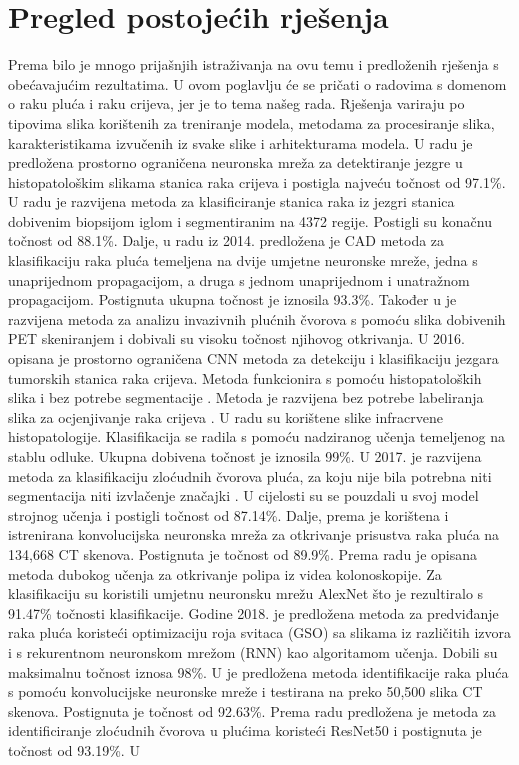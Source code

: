 \documentclass[conference, utf8]{IEEEtran}
\begin{document}
	\section{Pregled postojećih rješenja}
	Prema \cite{mehmood2022malignancy} bilo je mnogo prijašnjih istraživanja na ovu temu i predloženih rješenja s obećavajućim rezultatima. U ovom poglavlju će se pričati o radovima s domenom o raku pluća i raku crijeva, jer je to tema našeg rada. Rješenja variraju po tipovima slika korištenih za treniranje modela, metodama za procesiranje slika, karakteristikama izvučenih iz svake slike i arhitekturama modela. U radu \cite{Sirinukunwattana} je predložena prostorno ograničena neuronska mreža za detektiranje jezgre u histopatološkim slikama stanica raka crijeva i postigla najveću točnost od 97.1\%. U radu \cite{Multimodal_sparse} je razvijena metoda za klasificiranje stanica raka iz jezgri stanica dobivenim biopsijom iglom i segmentiranim na 4372 regije. Postigli su konačnu točnost od 88.1\%. Dalje, u radu iz 2014.\cite{kuruvilla2014lung} predložena je CAD metoda za klasifikaciju raka pluća temeljena na dvije umjetne neuronske mreže, jedna s unaprijednom propagacijom, a druga s jednom unaprijednom i unatražnom propagacijom. Postignuta ukupna točnost je iznosila 93.3\%. Također u \cite{deppen2014accuracy} je razvijena metoda za analizu invazivnih plućnih čvorova s pomoću slika dobivenih PET skeniranjem i dobivali su visoku točnost njihovog otkrivanja. U 2016. opisana je prostorno ograničena CNN metoda za detekciju i klasifikaciju jezgara tumorskih stanica raka crijeva. Metoda funkcionira s pomoću histopatoloških slika i bez potrebe segmentacije \cite{sirinukunwattana2016locality}. Metoda je razvijena bez potrebe labeliranja slika za ocjenjivanje raka crijeva \cite{kuepper2016label}. U radu su korištene slike infracrvene histopatologije. Klasifikacija se radila s pomoću nadziranog učenja temeljenog na stablu odluke. Ukupna dobivena točnost je iznosila 99\%. U 2017. je razvijena metoda za klasifikaciju zloćudnih čvorova pluća, za koju nije bila potrebna niti segmentacija niti izvlačenje značajki \cite{shen2017multi}. U cijelosti su se pouzdali u svoj model strojnog učenja i postigli točnost od 87.14\%. Dalje, prema \cite{sun2017automatic} je korištena i istrenirana konvolucijska neuronska mreža za otkrivanje prisustva raka pluća na 134,668 CT skenova. Postignuta je točnost od 89.9\%. Prema radu \cite{yuan2017automatic} je opisana metoda dubokog učenja za otkrivanje polipa iz videa kolonoskopije. Za klasifikaciju su koristili umjetnu neuronsku mrežu AlexNet što je rezultiralo s 91.47\% točnosti klasifikacije. Godine 2018. je predložena metoda za predviđanje raka pluća \cite{selvanambi2020lung} koristeći optimizaciju roja svitaca (GSO) sa slikama iz različitih izvora i s rekurentnom neuronskom mrežom (RNN) kao algoritamom učenja. Dobili su maksimalnu točnost iznosa 98\%. U \cite{de2018classification} je predložena metoda identifikacije raka pluća s pomoću konvolucijske neuronske mreže i testirana na preko 50,500 slika CT skenova. Postignuta je točnost od 92.63\%. Prema radu \cite{da2020lung} predložena je metoda za identificiranje zloćudnih čvorova u plućima koristeći ResNet50 i postignuta je točnost od 93.19\%. U \cite{masood2018computer} 
\end{document}
